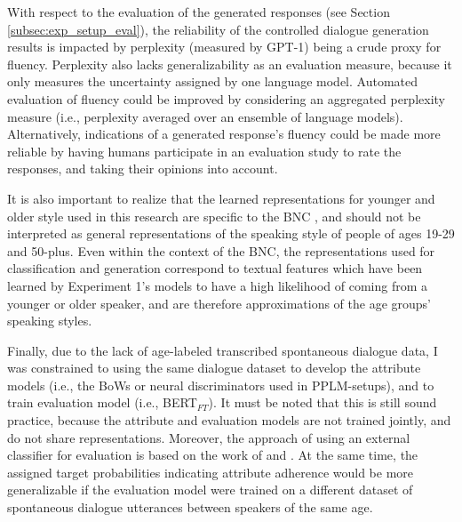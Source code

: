 
With respect to the evaluation of the generated responses (see Section \ref{subsec:exp_setup_eval}), the reliability of the controlled dialogue generation results is impacted by perplexity (measured by GPT-1) being a crude proxy for fluency. Perplexity also lacks generalizability as an evaluation measure, because it only measures the uncertainty assigned by one language model. Automated evaluation of fluency could be improved by considering an aggregated perplexity measure (i.e., perplexity averaged over an ensemble of language models). Alternatively, indications of a generated response's fluency could be made more reliable by having humans participate in an evaluation study to rate the responses, and taking their opinions into account. 

It is also important to realize that the learned representations for younger and older style used in this research are specific to the BNC \citep{love-spoken-bnc-2014}, and should not be interpreted as general representations of the speaking style of people of ages 19-29 and 50-plus. Even within the context of the BNC, the representations used for classification and generation 
correspond to textual features which have been learned by Experiment 1's models to have a high likelihood of coming from a younger or older speaker, 
and are therefore approximations of the age groups' speaking styles. 

Finally, due to the lack of age-labeled transcribed spontaneous dialogue data, I was constrained to using the same dialogue dataset to develop the attribute models (i.e., the BoWs or neural discriminators used in PPLM-setups), and to train evaluation model (i.e., BERT$_{FT}$). It must be noted that this is still sound practice, because the attribute and evaluation models are not trained jointly, and do not share representations. Moreover, the approach of using an external classifier for evaluation is based on the work of \cite{dathathri2019plug} and \cite{madotto-etal-2020-plug}. At the same time, the assigned target probabilities indicating attribute adherence would be more generalizable if the evaluation model were trained on a different dataset of spontaneous dialogue utterances between speakers of the same age.



